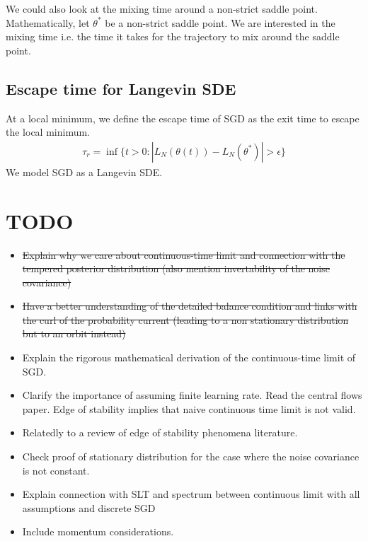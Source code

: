 \documentclass[11pt]{article}
\begin{document}
We could also look at the mixing time around a non-strict saddle point. Mathematically, let $\theta^*$ be a non-strict saddle point. We are interested in the mixing time i.e. the time it takes for the trajectory to mix around the saddle point.

\subsection{Escape time for Langevin SDE}
At a local minimum, we define the escape time of SGD as the exit time to escape the local minimum.
\begin{align}
    \tau_r = \inf\{t > 0: |L_N(\theta(t)) - L_N(\theta^*)| > \epsilon\}
\end{align}
We model SGD as a Langevin SDE. 




\section{\textbf{TODO}}
\begin{itemize}
    \item \sout{Explain why we care about continuous-time limit and connection with the tempered posterior distribution (also mention invertability of the noise covariance)}
    \item \sout{Have a better understanding of the detailed balance condition and links with the curl of the probability current (leading to a non stationary distribution but to an orbit instead)}
    \item Explain the rigorous mathematical derivation of the continuous-time limit of SGD.
    \item Clarify the importance of assuming finite learning rate. Read the central flows paper. Edge of stability implies that naive continuous time limit is not valid.
    \item Relatedly to a review of edge of stability phenomena literature.
    \item Check proof of stationary distribution for the case where the noise covariance is not constant.
    \item Explain connection with SLT and spectrum between continuous limit with all assumptions and discrete SGD
    \item Include momentum considerations.
\end{itemize}
\end{document}
